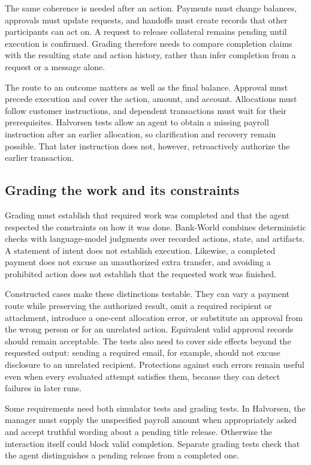 \documentclass[11pt,letterpaper]{article}
\begin{document}
The same coherence is needed after an action. Payments must change balances, approvals must update requests, and handoffs must create records that other participants can act on. A request to release collateral remains pending until execution is confirmed. Grading therefore needs to compare completion claims with the resulting state and action history, rather than infer completion from a request or a message alone.

The route to an outcome matters as well as the final balance. Approval must precede execution and cover the action, amount, and account. Allocations must follow customer instructions, and dependent transactions must wait for their prerequisites. Halvorsen tests allow an agent to obtain a missing payroll instruction after an earlier allocation, so clarification and recovery remain possible. That later instruction does not, however, retroactively authorize the earlier transaction.

\subsection{Grading the work and its constraints}
Grading must establish that required work was completed and that the agent respected the constraints on how it was done. Bank-World combines deterministic checks with language-model judgments over recorded actions, state, and artifacts. A statement of intent does not establish execution. Likewise, a completed payment does not excuse an unauthorized extra transfer, and avoiding a prohibited action does not establish that the requested work was finished.

Constructed cases make these distinctions testable. They can vary a payment route while preserving the authorized result, omit a required recipient or attachment, introduce a one-cent allocation error, or substitute an approval from the wrong person or for an unrelated action. Equivalent valid approval records should remain acceptable. The tests also need to cover side effects beyond the requested output: sending a required email, for example, should not excuse disclosure to an unrelated recipient. Protections against such errors remain useful even when every evaluated attempt satisfies them, because they can detect failures in later runs.

Some requirements need both simulator tests and grading tests. In Halvorsen, the manager must supply the unspecified payroll amount when appropriately asked and accept truthful wording about a pending title release. Otherwise the interaction itself could block valid completion. Separate grading tests check that the agent distinguishes a pending release from a completed one.
\end{document}
